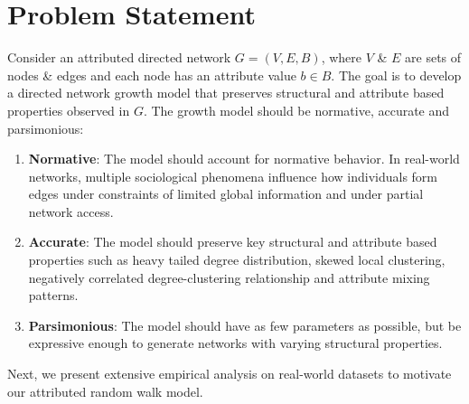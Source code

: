 \section{Problem Statement}
\label{sec:Problem Statement}

Consider an attributed directed network $G=(V,E,B)$, where $V$ \& $E$ are
sets of nodes \& edges and each node has an attribute value $b \in B$.
The goal is to develop a directed network growth model that preserves structural
and attribute based properties observed in $G$. The growth model should be
normative, accurate and parsimonious:
\begin{enumerate}
    \item \textbf{Normative}: The model should account for normative behavior. In real-world
    networks, multiple sociological phenomena influence how individuals form edges under
    constraints of limited global information and under partial network access.
    \item \textbf{Accurate}: The model should preserve key structural
    and attribute based properties such as heavy tailed degree distribution, skewed
    local clustering, negatively correlated degree-clustering relationship
    and attribute mixing patterns.
    \item \textbf{Parsimonious}: The model should have as few parameters as possible, but be expressive enough to generate networks with varying structural properties.
\end{enumerate}

Next, we present extensive empirical analysis on real-world datasets to motivate our attributed random walk model.


%
